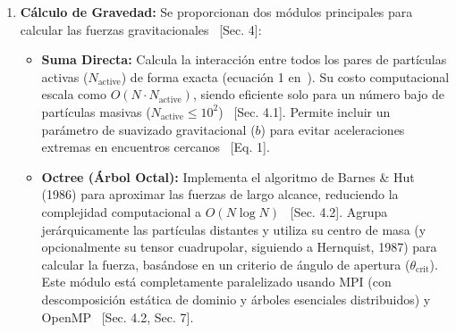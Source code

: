 \begin{enumerate}
    \item \textbf{Cálculo de Gravedad:} Se proporcionan dos módulos principales para calcular las fuerzas gravitacionales~\cite{Rein2012} [Sec. 4]:
    \begin{itemize}
        \item \textbf{Suma Directa:} Calcula la interacción entre todos los pares de partículas activas ($N_{\text{active}}$) de forma exacta (ecuación 1 en~\cite{Rein2012}). Su costo computacional escala como $O(N \cdot N_{\text{active}})$, siendo eficiente solo para un número bajo de partículas masivas ($N_{\text{active}} \le 10^2$)~\cite{Rein2012} [Sec. 4.1]. Permite incluir un parámetro de suavizado gravitacional ($b$) para evitar aceleraciones extremas en encuentros cercanos~\cite{Rein2012} [Eq. 1].
        \item \textbf{Octree (Árbol Octal):} Implementa el algoritmo de Barnes \& Hut (1986) para aproximar las fuerzas de largo alcance, reduciendo la complejidad computacional a $O(N \log N)$~\cite{Rein2012} [Sec. 4.2]. Agrupa jerárquicamente las partículas distantes y utiliza su centro de masa (y opcionalmente su tensor cuadrupolar, siguiendo a Hernquist, 1987) para calcular la fuerza, basándose en un criterio de ángulo de apertura ($\theta_{\text{crit}}$). Este módulo está completamente paralelizado usando MPI (con descomposición estática de dominio y árboles esenciales distribuidos) y OpenMP~\cite{Rein2012} [Sec. 4.2, Sec. 7].
    \end{itemize}


\end{enumerate}
